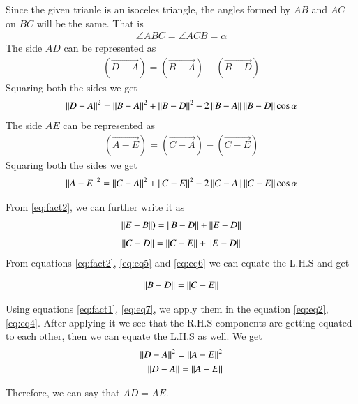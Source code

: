 \documentclass[journal,12pt,twocolumn]{IEEEtran}
\begin{document}
	Since the given trianle is an isoceles triangle, the angles formed by $AB$ and $AC$ on $BC$ will be the same. That is
	\begin{align}\label{eq:fact3}
		\angle ABC = \angle ACB = \alpha
	\end{align}
	The side $AD$ can be represented as 
	\begin{align}\label{eq:eq1}
		(\vec{D-A}) = (\vec{B-A}) - (\vec{B-D})
	\end{align}
	Squaring both the sides we get	
	\begin{align} \label{eq:eq2}
		\left\lVert D-A\right\rVert^{2} = \left\lVert B-A\right\rVert^{2} + \left\lVert B-D\right\rVert^{2} - 2\left\lVert B-A\right\rVert\left\lVert B-D\right\rVert\cos\alpha
	\end{align}
	The side $AE$ can be represented as 
	\begin{align}\label{eq:eq3}
		(\vec{A-E}) = (\vec{C-A}) - (\vec{C-E})
	\end{align}
	Squaring both the sides we get	
	\begin{align} \label{eq:eq4}
		\left\lVert A-E\right\rVert^{2} = \left\lVert C-A\right\rVert^{2} + \left\lVert C-E\right\rVert^{2} - 2\left\lVert C-A\right\rVert\left\lVert C-E\right\rVert\cos\alpha
	\end{align}
	
	From \eqref{eq:fact2}, we can further write it as 
	\begin{align}\label{eq:eq5}
		\left\lVert E-B\right\rVert) = \left\lVert B-D\right\rVert + \left\lVert E-D\right\rVert
	\end{align}
	\begin{align}\label{eq:eq6}
		\left\lVert C-D\right\rVert = \left\lVert C-E\right\rVert + \left\lVert E-D\right\rVert
	\end{align}
	From equations \eqref{eq:fact2}, \eqref{eq:eq5} and \eqref{eq:eq6} we can equate the L.H.S and get
	
	\begin{align}\label{eq:eq7}
		\left\lVert B-D\right\rVert = \left\lVert C-E\right\rVert
	\end{align}

	Using equations \eqref{eq:fact1}, \eqref{eq:eq7}, we apply them in the equation \eqref{eq:eq2}, \eqref{eq:eq4}. After applying it we see that the R.H.S components are getting equated to each other, then we can equate the L.H.S as well. We get 
	\begin{align}\label{eq:eq8}
		\left\lVert D-A\right\rVert^{2} = \left\lVert A-E\right\rVert^{2} \nonumber \\
		\left\lVert D-A\right\rVert = \left\lVert A-E\right\rVert
	\end{align}
	
	Therefore, we can say that $AD = AE$.
	
\end{document}
